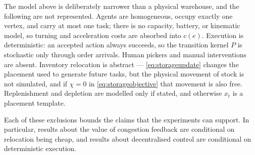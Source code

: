 \documentclass[../main.tex]{subfiles}
\begin{document}
The model above is deliberately narrower than a physical warehouse, and the
following are not represented. Agents are homogeneous, occupy exactly one vertex,
and carry at most one task; there is no capacity, battery, or kinematic model, so
turning and acceleration costs are absorbed into $c(e)$. Execution is
deterministic: an accepted action always succeeds, so the transition kernel $P$
is stochastic only through order arrivals. Human pickers and manual interventions
are absent. Inventory relocation is abstract --- \eqref{eq:storageupdate} changes
the placement used to generate future tasks, but the physical movement of stock
is not simulated, and if $\chi = 0$ in \eqref{eq:storageobjective} that movement
is also free. Replenishment and depletion are modelled only if stated, and
otherwise $x_t$ is a placement template.

Each of these exclusions bounds the claims that the experiments can support. In
particular, results about the value of congestion feedback are conditional on
relocation being cheap, and results about decentralised control are conditional
on deterministic execution.
\end{document}
